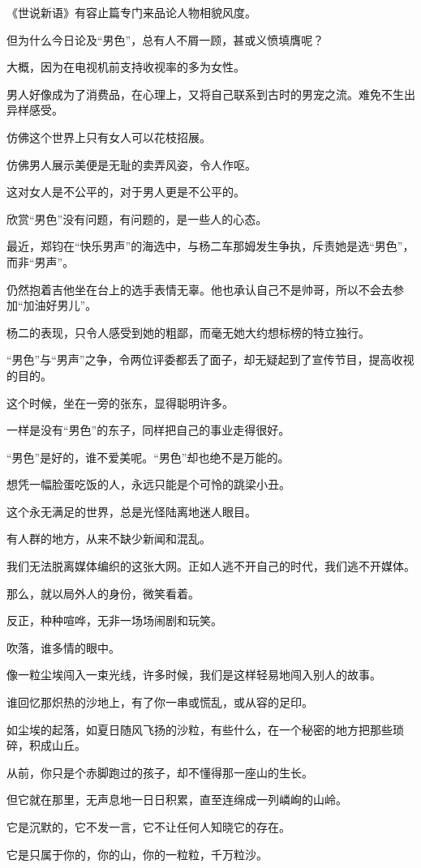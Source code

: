 \documentclass[12pt,a4paper]{article}
\def\blankrev{\vspace{1ex}}									%
\begin{document}
		《世说新语》有容止篇专门来品论人物相貌风度。\par
		但为什么今日论及“男色”，总有人不屑一顾，甚或义愤填膺呢？\par
		大概，因为在电视机前支持收视率的多为女性。\par
		男人好像成为了消费品，在心理上，又将自己联系到古时的男宠之流。难免不生出异样感受。\par
		仿佛这个世界上只有女人可以花枝招展。\par
		仿佛男人展示美便是无耻的卖弄风姿，令人作呕。\par
		这对女人是不公平的，对于男人更是不公平的。\par
		欣赏“男色”没有问题，有问题的，是一些人的心态。\par
		最近，郑钧在“快乐男声”的海选中，与杨二车那姆发生争执，斥责她是选“男色”，而非“男声”。\par
		仍然抱着吉他坐在台上的选手表情无辜。他也承认自己不是帅哥，所以不会去参加“加油好男儿”。\par
		杨二的表现，只令人感受到她的粗鄙，而毫无她大约想标榜的特立独行。\par
		“男色”与“男声”之争，令两位评委都丢了面子，却无疑起到了宣传节目，提高收视的目的。\par
		这个时候，坐在一旁的张东，显得聪明许多。\par
		一样是没有“男色”的东子，同样把自己的事业走得很好。\par
		“男色”是好的，谁不爱美呢。“男色”却也绝不是万能的。\par
		想凭一幅脸蛋吃饭的人，永远只能是个可怜的跳梁小丑。

		这个永无满足的世界，总是光怪陆离地迷人眼目。\par
		有人群的地方，从来不缺少新闻和混乱。\par
		我们无法脱离媒体编织的这张大网。正如人逃不开自己的时代，我们逃不开媒体。\par
		那么，就以局外人的身份，微笑看着。\par
		反正，种种喧哗，无非一场场闹剧和玩笑。

	\endwriting



		吹落，谁多情的眼中。

		\blankrev
		像一粒尘埃闯入一束光线，许多时候，我们是这样轻易地闯入别人的故事。

		谁回忆那炽热的沙地上，有了你一串或慌乱，或从容的足印。\par
		如尘埃的起落，如夏日随风飞扬的沙粒，有些什么，在一个秘密的地方把那些琐碎，积成山丘。\par
		从前，你只是个赤脚跑过的孩子，却不懂得那一座山的生长。\par
		但它就在那里，无声息地一日日积累，直至连绵成一列嶙峋的山岭。\par
		它是沉默的，它不发一言，它不让任何人知晓它的存在。\par
		它是只属于你的，你的山，你的一粒粒，千万粒沙。
\end{document}
